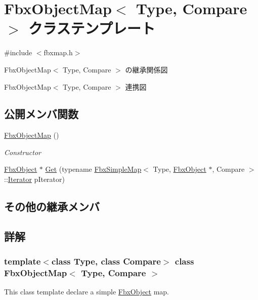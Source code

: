 \hypertarget{class_fbx_object_map}{}\section{Fbx\+Object\+Map$<$ Type, Compare $>$ クラステンプレート}
\label{class_fbx_object_map}


{\ttfamily \#include $<$fbxmap.\+h$>$}



Fbx\+Object\+Map$<$ Type, Compare $>$ の継承関係図


Fbx\+Object\+Map$<$ Type, Compare $>$ 連携図
\subsection*{公開メンバ関数}
\begin{DoxyCompactItemize}
\item 
\hyperlink{class_fbx_object_map_a6567cb563c8c14bf79104468c8622d44}{Fbx\+Object\+Map} ()
\begin{DoxyCompactList}\small\item\em Constructor \end{DoxyCompactList}\item 
\hyperlink{class_fbx_object}{Fbx\+Object} $\ast$ \hyperlink{class_fbx_object_map_a0f91929931a5379c7983812644ff706a}{Get} (typename \hyperlink{class_fbx_simple_map}{Fbx\+Simple\+Map}$<$ Type, \hyperlink{class_fbx_object}{Fbx\+Object} $\ast$, Compare $>$\+::\hyperlink{class_fbx_simple_map_aaa589eb5e1ccdd11dffd018f3212e13e}{Iterator} p\+Iterator)
\end{DoxyCompactItemize}
\subsection*{その他の継承メンバ}


\subsection{詳解}
\subsubsection*{template$<$class Type, class Compare$>$\newline
class Fbx\+Object\+Map$<$ Type, Compare $>$}

This class template declare a simple \hyperlink{class_fbx_object}{Fbx\+Object} map. 

